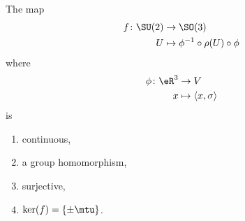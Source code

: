 \begin{proposition}     \label{PROPooGEHAooPCReoU}
    The map
    \begin{equation}        \label{EQooSOZTooTIkONx}
        \begin{aligned}
            f\colon \SU(2)&\to \SO(3) \\
            U&\mapsto \phi^{-1}\circ \rho(U)\circ\phi 
        \end{aligned}
    \end{equation}
    where
    \begin{equation}
        \begin{aligned}
            \phi\colon \eR^3&\to V \\
            x&\mapsto \langle x, \sigma\rangle 
        \end{aligned}
    \end{equation}
    is
    \begin{enumerate}
        \item
            continuous,
        \item
            a group homomorphism,
        \item       \label{ITEMooZSSHooDUCqSQ}
            surjective,
        \item
            \( \ker(f)=\{ \pm \mtu \}\).
    \end{enumerate}
\end{proposition}

